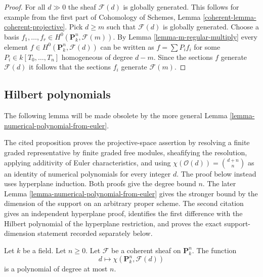 \begin{proof}
For all $d \gg 0$ the sheaf $\mathcal{F}(d)$ is globally generated.
This follows for example from the first part of
Cohomology of Schemes, Lemma \ref{coherent-lemma-coherent-projective}.
Pick $d \geq m$ such that $\mathcal{F}(d)$ is globally generated.
Choose a basis
$f_1, \ldots, f_r \in H^0(\mathbf{P}^n_k, \mathcal{F}(m))$.
By Lemma \ref{lemma-m-regular-multiply} every element
$f \in H^0(\mathbf{P}^n_k, \mathcal{F}(d))$ can be written as
$f = \sum P_if_i$ for some $P_i \in k[T_0, \ldots, T_n]$ homogeneous
of degree $d - m$. Since the sections $f$ generate $\mathcal{F}(d)$
it follows that the sections $f_i$ generate $\mathcal{F}(m)$.
\end{proof}

\subsection{Hilbert polynomials}
\label{subsection-hilbert}

\noindent
The following lemma will be made obsolete by the more general
Lemma \ref{lemma-numerical-polynomial-from-euler}.

\begin{lemma}
\label{lemma-hilbert-polynomial}
\begin{reference}
\cite[Chapter III, \S 6, no. 80, Proposition 3 and proof, p. 275]{FAC}
\cite[Chapter III, \S 6, no. 81, Proposition 6 and Remark 2,
pp. 276--277]{FAC}
\end{reference}
\begin{history}
The cited proposition proves the projective-space assertion by resolving a
finite graded representative by finite graded free modules, sheafifying the
resolution, applying additivity of Euler characteristics, and using
$\chi(\mathcal{O}(d)) = \binom{d + n}{n}$ as an identity of numerical
polynomials for every integer $d$. The proof below instead uses hyperplane
induction. Both proofs give the degree bound $n$. The later Lemma
\ref{lemma-numerical-polynomial-from-euler} gives the stronger bound by the
dimension of the support on an arbitrary proper scheme.
The second citation gives an independent hyperplane proof, identifies the
first difference with the Hilbert polynomial of the hyperplane restriction,
and proves the exact support-dimension statement recorded separately below.
\end{history}
Let $k$ be a field. Let $n \geq 0$. Let $\mathcal{F}$ be a coherent sheaf
on $\mathbf{P}^n_k$. The function
$$
d \longmapsto \chi(\mathbf{P}^n_k, \mathcal{F}(d))
$$
is a polynomial of degree at most $n$.
\end{lemma}

